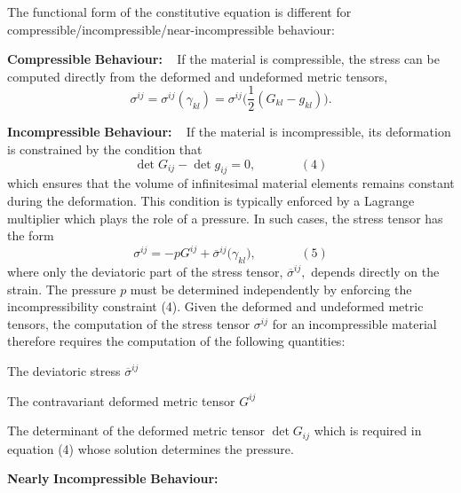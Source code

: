 The functional form of the constitutive equation is different for compressible/incompressible/near-\/incompressible behaviour\+:
\begin{DoxyEnumerate}
\item {\bfseries Compressible} {\bfseries Behaviour\+:} ~\newline
 If the material is compressible, the stress can be computed directly from the deformed and undeformed metric tensors, \[ \sigma^{ij} = \sigma^{ij}(\gamma_{kl}) = \sigma^{ij}\bigg( \frac{1}{2} (G_{kl} - g_{kl})\bigg). \]
\item {\bfseries Incompressible} {\bfseries Behaviour\+:} ~\newline
 If the material is incompressible, its deformation is constrained by the condition that \[ \det G_{ij} - \det g_{ij}= 0, \ \ \ \ \ \ \ \ \ \ \ \ \ \ \ \ (4) \] which ensures that the volume of infinitesimal material elements remains constant during the deformation. This condition is typically enforced by a Lagrange multiplier which plays the role of a pressure. In such cases, the stress tensor has the form \[ \sigma^{ij} = -p G^{ij} + \overline{\sigma}^{ij}\big(\gamma_{kl}\big), \ \ \ \ \ \ \ \ \ \ \ \ \ \ \ \ (5) \] where only the deviatoric part of the stress tensor, $ \overline{\sigma}^{ij}, $ depends directly on the strain. The pressure $ p $ must be determined independently by enforcing the incompressibility constraint (4). Given the deformed and undeformed metric tensors, the computation of the stress tensor $ \sigma^{ij} $ for an incompressible material therefore requires the computation of the following quantities\+:
\begin{DoxyItemize}
\item The deviatoric stress $ \overline{\sigma}^{ij} $
\item The contravariant deformed metric tensor $ G^{ij} $
\item The determinant of the deformed metric tensor $ \det G_{ij} $ which is required in equation (4) whose solution determines the pressure.
\end{DoxyItemize}
\item {\bfseries Nearly} {\bfseries Incompressible} {\bfseries Behaviour\+:} ~\newline

\end{DoxyEnumerate}
